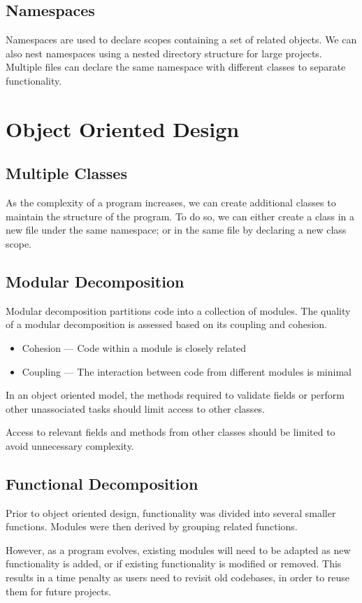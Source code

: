 \documentclass{article}
\begin{document}
\subsection{Namespaces}
Namespaces are used to declare scopes containing a set of related objects. We can also nest namespaces
using a nested directory structure for large projects. Multiple files can declare the same namespace
with different classes to separate functionality.
\section{Object Oriented Design}
\subsection{Multiple Classes}
As the complexity of a program increases, we can create additional classes to maintain the structure of
the program. To do so, we can either create a class in a new file under the same namespace; or in the
same file by declaring a new class scope.
\subsection{Modular Decomposition}
Modular decomposition partitions code into a collection of modules.
The quality of a modular decomposition is assessed based on its coupling and cohesion.
\begin{itemize}
    \item Cohesion --- Code within a module is closely related
    \item Coupling --- The interaction between code from different modules is minimal
\end{itemize}
In an object oriented model, the methods required to validate fields or perform other
unassociated tasks should limit access to other classes.

Access to relevant fields and methods from other classes should be
limited to avoid unnecessary complexity.
\subsection{Functional Decomposition}
Prior to object oriented design, functionality was divided into several smaller functions.
Modules were then derived by grouping related functions.

However, as a program evolves, existing modules will need to be adapted
as new functionality is added, or if existing functionality is modified or removed.
This results in a time penalty as users need to revisit old codebases,
in order to reuse them for future projects.
\end{document}
